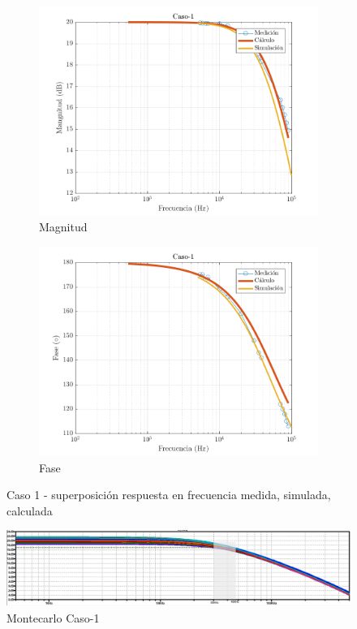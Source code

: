 \documentclass[../../main.tex]{subfiles}
\begin{document}
\begin{figure}[H]
\centering
\begin{subfigure}[http]{0.49\textwidth}
\includegraphics[width=\textwidth]{Caso-1_mag_inv}
\caption{Magnitud}\label{fig=magInvC1}
\end{subfigure}
\begin{subfigure}[http]{0.49\textwidth}
\includegraphics[width=\textwidth]{Caso-1_fase_inv}
\caption{Fase}
\end{subfigure}
\caption{Caso 1 - superposición respuesta en  frecuencia medida, simulada, calculada}
\end{figure}

\begin{figure}[H]
\centering
\includegraphics[width=1\textwidth]{montecarlo_inv_c1}
\caption{Montecarlo Caso-1} \label{fig=mcInvC1}
\end{figure}
\end{document}
